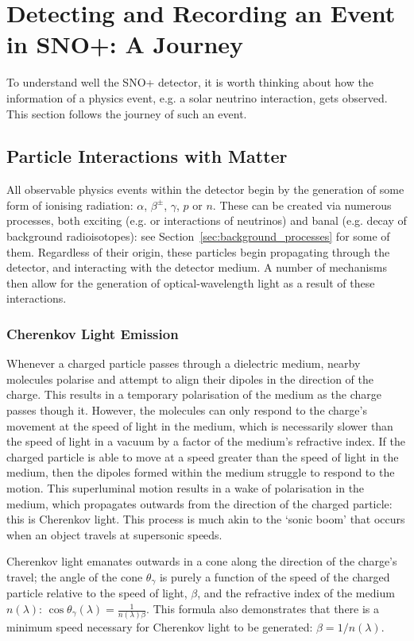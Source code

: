 \section{Detecting and Recording an Event in SNO+: A Journey}\label{sec:event_journey}
To understand well the SNO+ detector, it is worth thinking about how the information of a physics event, e.g. a solar neutrino interaction, gets observed. This section follows the journey of such an event.
\subsection{Particle Interactions with Matter}\label{sec:interactions_w_matter}
All observable physics events within the detector begin by the generation of some form of ionising radiation: $\alpha$, $\beta^{\pm}$, $\gamma$, $p$ or $n$. These can be created via numerous processes, both exciting (e.g. \onbb{} or interactions of neutrinos) and banal (e.g. decay of background radioisotopes): see Section~\ref{sec:background_processes} for some of them. Regardless of their origin, these particles begin propagating through the detector, and interacting with the detector medium. A number of mechanisms then allow for the generation of optical-wavelength light as a result of these interactions.
\subsubsection{Cherenkov Light Emission}
Whenever a charged particle passes through a dielectric medium, nearby molecules polarise and attempt to align their dipoles in the direction of the charge. This results in a temporary polarisation of the medium as the charge passes though it. However, the molecules can only respond to the charge's movement at the speed of light in the medium, which is necessarily slower than the speed of light in a vacuum by a factor of the medium's refractive index. If the charged particle is able to move at a speed greater than the speed of light in the medium, then the dipoles formed within the medium struggle to respond to the motion. This superluminal motion results in a wake of polarisation in the medium, which propagates outwards from the direction of the charged particle: this is Cherenkov light. This process is much akin to the `sonic boom' that occurs when an object travels at supersonic speeds.

Cherenkov light emanates outwards in a cone along the direction of the charge's travel; the angle of the cone $\theta_{\gamma}$ is purely a function of the speed of the charged particle relative to the speed of light, $\beta$, and the refractive index of the medium $n(\lambda)$: $\cos{\theta_{\gamma}}(\lambda) = \frac{1}{n(\lambda)\beta}$. This formula also demonstrates that there is a minimum speed necessary for Cherenkov light to be generated: $\beta = 1/n(\lambda)$.

